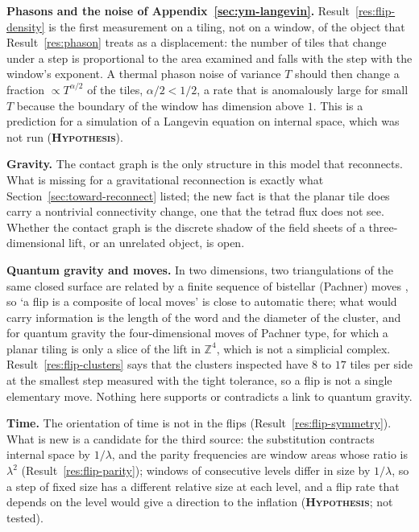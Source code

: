 \documentclass[11pt]{article}
\newcommand{\hypo}{\textbf{\textsc{Hypothesis}}}
\theoremstyle{definition}
\begin{document}
\textbf{Phasons and the noise of Appendix~\ref{sec:ym-langevin}.} Result~\ref{res:flip-density} is the first measurement on a tiling, not on a window, of the object that Result~\ref{res:phason} treats as a displacement: the number of tiles that change under a step is proportional to the area examined and falls with the step with the window's exponent. A thermal phason noise of variance $T$ should then change a fraction $\propto T^{\alpha/2}$ of the tiles, $\alpha/2<1/2$, a rate that is anomalously large for small $T$ because the boundary of the window has dimension above $1$. This is a prediction for a simulation of a Langevin equation on internal space, which was not run (\hypo).

\textbf{Gravity.} The contact graph is the only structure in this model that reconnects. What is missing for a gravitational reconnection is exactly what Section~\ref{sec:toward-reconnect} listed; the new fact is that the planar tile does carry a nontrivial connectivity change, one that the tetrad flux does not see. Whether the contact graph is the discrete shadow of the field sheets of a three-dimensional lift, or an unrelated object, is open.

\textbf{Quantum gravity and moves.} In two dimensions, two triangulations of the same closed surface are related by a finite sequence of bistellar (Pachner) moves \cite{pachner1991}, so `a flip is a composite of local moves' is close to automatic there; what would carry information is the length of the word and the diameter of the cluster, and for quantum gravity the four-dimensional moves of Pachner type, for which a planar tiling is only a slice of the lift in $\mathbb{Z}^4$, which is not a simplicial complex. Result~\ref{res:flip-clusters} says that the clusters inspected have $8$ to $17$ tiles per side at the smallest step measured with the tight tolerance, so a flip is not a single elementary move. Nothing here supports or contradicts a link to quantum gravity.

\textbf{Time.} The orientation of time is not in the flips (Result~\ref{res:flip-symmetry}). What is new is a candidate for the third source: the substitution contracts internal space by $1/\lambda$, and the parity frequencies are window areas whose ratio is $\lambda^2$ (Result~\ref{res:flip-parity}); windows of consecutive levels differ in size by $1/\lambda$, so a step of fixed size has a different relative size at each level, and a flip rate that depends on the level would give a direction to the inflation (\hypo; not tested).
\end{document}

